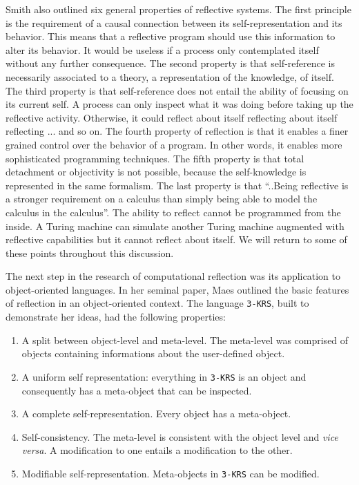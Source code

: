 Smith also outlined six general properties of reflective systems. The first principle is the requirement of a causal connection between
its self-representation and its behavior. This means that a reflective program should use this information to alter its
behavior. It would be useless if a process only contemplated itself without any further consequence. The second property is that
self-reference is necessarily associated to a theory, a representation of the knowledge, of itself. The third property is that
self-reference does not entail the ability of focusing on its current self. A process can only inspect what it was doing before
taking up the reflective activity. Otherwise, it could reflect about itself reflecting about itself reflecting ... and so on.
The fourth property of reflection is that it enables a finer grained control over the behavior of a program. In other words, it
enables more sophisticated programming techniques. The fifth property is that total detachment or objectivity is not possible,
because the self-knowledge is represented in the same formalism. The last property is that ``..Being reflective is a stronger
requirement on a calculus than simply being able to model the calculus in the calculus''. The ability to reflect cannot be
programmed from the inside. A Turing machine can simulate another Turing machine augmented with reflective capabilities but it
cannot reflect about itself. We will return to some of these points throughout this discussion.

The next step in the research of computational reflection was its application to object-oriented languages. In her seminal paper, Maes \cite{Maes}
outlined the basic features of reflection in an object-oriented context. The language \texttt{3-KRS}, built to demonstrate her ideas, had the
following properties:

\begin{enumerate}
 \item A split between object-level and meta-level. The meta-level was comprised of objects containing informations about the user-defined
object.
 \item A uniform self representation: everything in \texttt{3-KRS} is an object and consequently has a meta-object that can be inspected.
 \item A complete self-representation. Every object has a meta-object.
 \item Self-consistency. The meta-level is consistent with the object level and \emph{vice versa}. A modification to one entails a modification
to the other. 
  \item Modifiable self-representation. Meta-objects in \texttt{3-KRS} can be modified.
\end{enumerate}

